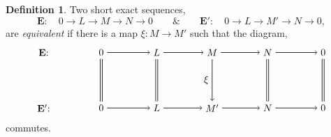 \documentclass[11.5pt, twoside, a4paper, titlepage]{report}
\theoremstyle{definition}
\newtheorem{mydef}{Definition}[section]
\theoremstyle{plain}
\begin{document}
\begin{mydef}
Two short exact sequences,
\begin{equation*}
\mathbf{E}: \quad 0\xrightarrow{}L\xrightarrow{}M\xrightarrow{}N\xrightarrow{}0 \qquad \& \qquad \mathbf{E'}: \quad 0\xrightarrow{}L\xrightarrow{}M'\xrightarrow{}N\xrightarrow{}0 ,
\end{equation*}
are \emph{equivalent} if there is a map $\xi: M \to M'$ such that the diagram,
\begin{equation*}
\begin{tikzpicture}[->,-latex, auto, main path/.style={->, semithick}, main node/.style={}]
\node	[main node]		(1) at (0,0)		{$\mathbf{E}$: \quad };
\node	[main node]		(2) at (2,0)		{$0$};
\node	[main node]		(3) at (4,0)		{$L$};
\node [main node]		(4) at (6,0)		{$M$};
\node [main node]		(5) at (8,0)		{$N$};
\node	[main node]		(11) at (10,0)	{$0$};

\node	[main node]		(6) at (0,-2)		{$\mathbf{E'}$: \quad};
\node	[main node]		(7) at (2,-2)		{$0$};
\node	[main node]		(8) at (4,-2)		{$L$};
\node [main node]		(9) at (6,-2)		{$M'$};
\node [main node]		(10) at (8,-2)	{$N$};
\node [main node]		(13) at (10,-2)	{$0$};

\draw (2) edge [main path] node [auto] {$$} (3);
\draw (3) edge [main path] node [auto] {$$} (4);
\draw (4) edge [main path] node [auto] {$$} (5);
\draw (5) edge [main path] (11);

\draw (7) edge [main path] node [auto] {$$} (8);
\draw (8) edge [main path] node [auto] {$$} (9);
\draw (9) edge [main path] node [auto] {$$} (10);
\draw (10) edge [main path] (13);

\draw (3) edge [-, semithick, double, double distance=1.5pt] (8);
\draw (4) edge [main path] node [auto, swap] {$\xi$} (9);
\draw (5) edge [-, semithick, double, double distance=1.5pt](10);
\draw (11) edge [-, semithick, double, double distance=1.5pt] (13);
\draw (2) edge [-, semithick, double, double distance=1.5pt] (7);
\end{tikzpicture}
\end{equation*}
commutes.
\end{mydef}
\end{document}

